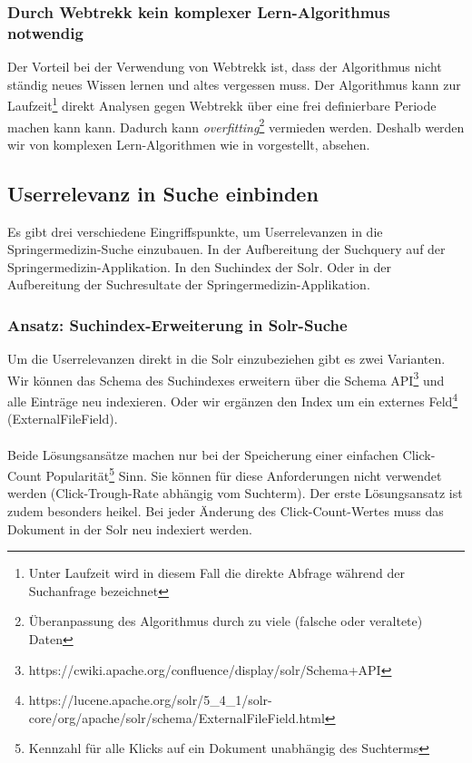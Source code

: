 \subsubsection{Durch Webtrekk kein komplexer Lern-Algorithmus notwendig}
\label{sec:Einfuehrung:Methodik:Click-Trough-Daten:Lern-Algorithmus}

Der Vorteil bei der Verwendung von Webtrekk ist, dass der Algorithmus nicht ständig neues Wissen lernen und altes vergessen muss. Der Algorithmus kann zur Laufzeit\footnote{Unter Laufzeit wird in diesem Fall die direkte Abfrage während der Suchanfrage bezeichnet} direkt Analysen gegen Webtrekk über eine frei definierbare Periode machen kann kann. Dadurch kann \textit{overfitting}\footnote{Überanpassung des Algorithmus durch zu viele (falsche oder veraltete) Daten} vermieden werden. Deshalb werden wir von komplexen Lern-Algorithmen wie in \cite{IWUSBI} vorgestellt, absehen.

\subsection{Userrelevanz in Suche einbinden}
\label{sec:Einfuehrung:Methodik:SucheEinbinden}

Es gibt drei verschiedene Eingriffspunkte, um Userrelevanzen in die Springermedizin-Suche einzubauen. In der Aufbereitung der Suchquery auf der Springermedizin-Applikation. In den Suchindex der Solr. Oder in der Aufbereitung der Suchresultate der Springermedizin-Applikation. 

\subsubsection{Ansatz: Suchindex-Erweiterung in Solr-Suche}
\label{sec:Einfuehrung:Methodik:SucheEinbinden:SolrSuche}

Um die Userrelevanzen direkt in die Solr einzubeziehen gibt es zwei Varianten. Wir können das Schema des Suchindexes erweitern über die Schema API\footnote{https://cwiki.apache.org/confluence/display/solr/Schema+API} und alle Einträge neu indexieren. Oder wir ergänzen den Index um ein externes Feld\footnote{https://lucene.apache.org/solr/5\_4\_1/solr-core/org/apache/solr/schema/ExternalFileField.html} (ExternalFileField).
\\
\\
Beide Lösungsansätze machen nur bei der Speicherung einer einfachen Click-Count Popularität\footnote{Kennzahl für alle Klicks auf ein Dokument unabhängig des Suchterms} Sinn. Sie können für diese Anforderungen nicht verwendet werden (Click-Trough-Rate abhängig vom Suchterm). Der erste Lösungsansatz ist zudem besonders heikel. Bei jeder Änderung des Click-Count-Wertes muss das Dokument in der Solr neu indexiert werden.

